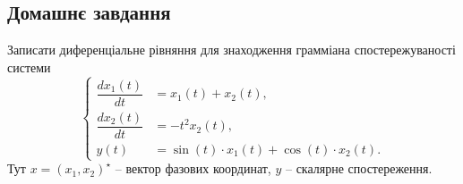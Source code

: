 
\subsection{Домашнє завдання}

\begin{problem}
\end{problem}

\begin{solution}
\end{solution}

\begin{problem}
    Записати диференціальне рівняння для знаходження грамміана спостережуваності системи
    \begin{equation*}
        \left\{
            \begin{aligned}
                \dfrac{dx_1(t)}{dt} &= x_1(t) + x_2(t), \\
                \dfrac{dx_2(t)}{dt} &= - t^2x_2(t), \\
                y(t) &= \sin (t) \cdot x_1(t) + \cos (t) \cdot x_2(t).
            \end{aligned}   
        \right.
    \end{equation*}
    Тут $x = (x_1, x_2)^\star$ -- вектор фазових координат, $y$ -- скалярне спостереження.
\end{problem}

